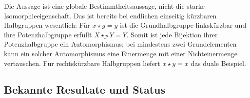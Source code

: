 \documentclass[main.tex]{subfiles}
\begin{document}
\begin{tabproofsplitwide}
  \closeproofpartwide
\end{tabproofsplitwide}
\endgroup

Die Aussage ist eine globale Bestimmtheitsaussage, nicht die starke
Isomorphieeigenschaft.  Das ist bereits bei endlichen einseitig kürzbaren
Halbgruppen wesentlich: Für \(x\star y=y\) ist die Grundhalbgruppe
linkskürzbar und ihre Potenzhalbgruppe erfüllt \(X\star_{\mathcal P}Y=Y\).
Somit ist jede Bijektion ihrer Potenzhalbgruppe ein Automorphismus; bei
mindestens zwei Grundelementen kann ein solcher Automorphismus eine
Einermenge mit einer Nichteinermenge vertauschen.  Für rechtskürzbare
Halbgruppen liefert \(x\star y=x\) das duale Beispiel.

\subsection{Bekannte Resultate und Status}
\end{document}

